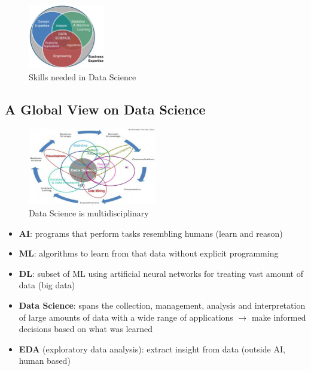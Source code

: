 \documentclass[a4paper]{article}
\begin{document}
		\begin{figure}[htb!]
			\centering
			\includegraphics[width=0.3\textwidth]{img/sw01/ds_skills.png}
			\caption{Skills needed in Data Science}
		\end{figure}
	
		\subsection{A Global View on Data Science}
		
		\begin{figure}[htb!]
			\centering
			\includegraphics[width=0.5\textwidth]{img/sw01/multidisc.png}
			\caption{Data Science is multidisciplinary}
		\end{figure}
	
		\newpage
		
		\begin{itemize}
			\item \textbf{AI}: programs that perform tasks resembling humans (learn and reason)
			\item \textbf{ML}: algorithms to learn from that data without explicit programming
			\item \textbf{DL}: subset of ML using artificial neural networks for treating vast amount of data (big data)
			\item \textbf{Data Science}: spans the collection, management, analysis and interpretation of large amounts of data with a wide range of applications $\rightarrow$
				make informed decisions based on what was learned
			\item \textbf{EDA} (exploratory data analysis): extract insight from data (outside AI, human based)
		\end{itemize}
	
\end{document}
